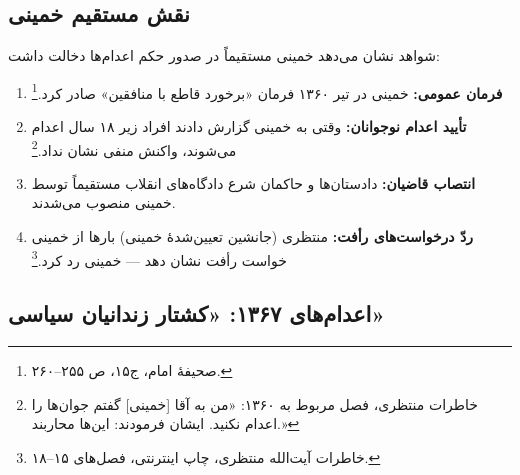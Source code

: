 \subsection{نقش مستقیم خمینی}

\begin{warningBox}
شواهد نشان می‌دهد خمینی مستقیماً در صدور حکم اعدام‌ها دخالت داشت:

\begin{enumerate}[label=\textcolor{cAccent}{\bfseries\arabic*.}, rightmargin=2em]
    \item \textbf{فرمان عمومی:} خمینی در تیر ۱۳۶۰ فرمان «برخورد قاطع با منافقین» صادر کرد.\footnote{صحیفهٔ امام، ج۱۵، ص ۲۵۵–۲۶۰.}
    
    \item \textbf{تأیید اعدام نوجوانان:} وقتی به خمینی گزارش دادند افراد زیر ۱۸ سال اعدام می‌شوند، واکنش منفی نشان نداد.\footnote{خاطرات منتظری، فصل مربوط به ۱۳۶۰: «من به آقا [خمینی] گفتم جوان‌ها را اعدام نکنید. ایشان فرمودند: این‌ها محاربند.»}
    
    \item \textbf{انتصاب قاضیان:} دادستان‌ها و حاکمان شرع دادگاه‌های انقلاب مستقیماً توسط خمینی منصوب می‌شدند.
    
    \item \textbf{ردّ درخواست‌های رأفت:} منتظری (جانشین تعیین‌شدهٔ خمینی) بارها از خمینی خواست رأفت نشان دهد — خمینی رد کرد.\footnote{خاطرات آیت‌الله منتظری، چاپ اینترنتی، فصل‌های ۱۵–۱۸.}
\end{enumerate}
\end{warningBox}

\subsection{اعدام‌های ۱۳۶۷: «کشتار زندانیان سیاسی»}


